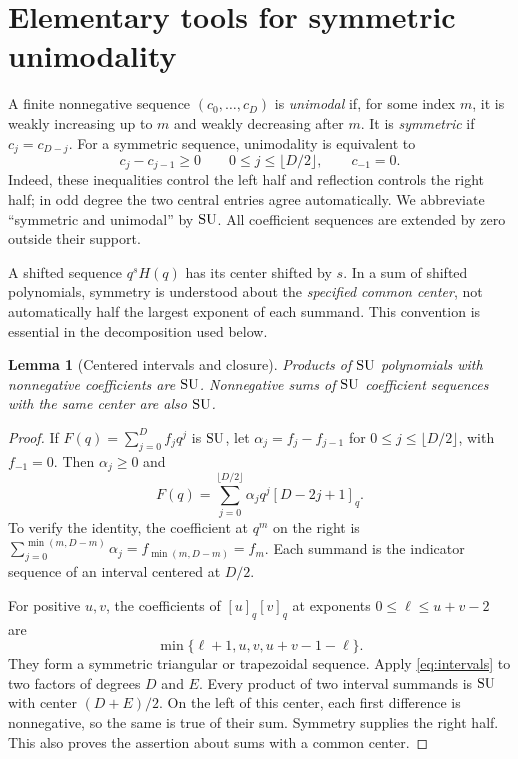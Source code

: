 \documentclass[11pt]{article}
\theoremstyle{research}
\newtheorem{lemma}[theorem]{Lemma}
\theoremstyle{definition}
\newcommand{\qi}[1]{[#1]_q}
\newcommand{\SU}{\textup{SU}}
\numberwithin{equation}{section}
\begin{document}
\section{Elementary tools for symmetric unimodality}
\label{sec:tools}
A finite nonnegative sequence $(c_0,\ldots,c_D)$ is \emph{unimodal} if,
for some index $m$, it is weakly increasing up to $m$ and weakly decreasing
after $m$. It is \emph{symmetric} if $c_j=c_{D-j}$.
For a symmetric sequence, unimodality is equivalent to
\begin{equation}\label{eq:firsthalf}
 c_j-c_{j-1}\ge0\qquad
 0\le j\le\lfloor D/2\rfloor,
 \qquad c_{-1}=0.
\end{equation}
Indeed, these inequalities control the left half and reflection controls the
right half; in odd degree the two central entries agree automatically.
We abbreviate ``symmetric and unimodal'' by $\SU$.
All coefficient sequences are extended by zero outside their support.

A shifted sequence $q^sH(q)$ has its center shifted by $s$.
In a sum of shifted polynomials, symmetry is understood about the
\emph{specified common center}, not automatically half the largest
exponent of each summand. This convention is essential in the decomposition
used below.

\begin{lemma}[Centered intervals and closure]\label{lem:closure}
Products of $\SU$ polynomials with nonnegative coefficients are $\SU$.
Nonnegative sums of $\SU$ coefficient sequences with the same center are
also $\SU$.
\end{lemma}
\begin{proof}
If $F(q)=\sum_{j=0}^D f_jq^j$ is $\SU$, let
$\alpha_j=f_j-f_{j-1}$ for $0\le j\le\lfloor D/2\rfloor$, with
$f_{-1}=0$. Then $\alpha_j\ge0$ and
\begin{equation}\label{eq:intervals}
 F(q)=\sum_{j=0}^{\lfloor D/2\rfloor}
          \alpha_j q^j\qi{D-2j+1}.
\end{equation}
To verify the identity, the coefficient at $q^m$ on the right is
$\sum_{j=0}^{\min(m,D-m)}\alpha_j=f_{\min(m,D-m)}=f_m$.
Each summand is the indicator sequence of an interval centered at $D/2$.

For positive $u,v$, the coefficients of $\qi{u}\qi{v}$ at exponents
$0\le\ell\le u+v-2$ are
\[
 \min\{\ell+1,u,v,u+v-1-\ell\}.
\]
They form a symmetric triangular or trapezoidal sequence.
Apply \eqref{eq:intervals} to two factors of degrees $D$ and $E$.
Every product of two interval summands is $\SU$ with center $(D+E)/2$.
On the left of this center, each first difference is nonnegative, so the
same is true of their sum. Symmetry supplies the right half. This also
proves the assertion about sums with a common center.
\end{proof}
\end{document}
